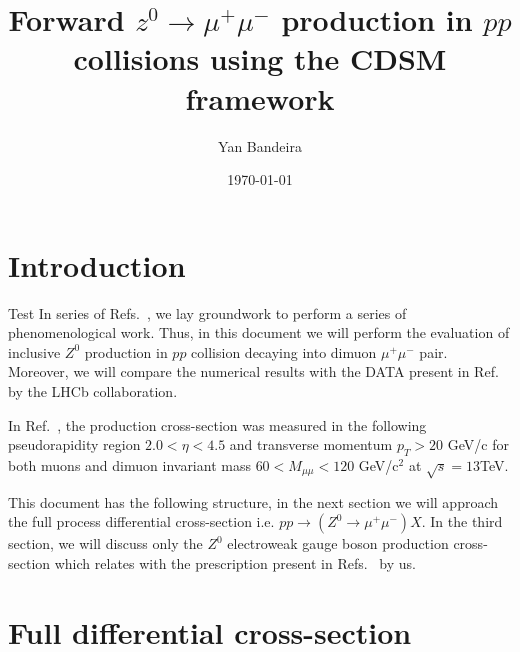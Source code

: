 \documentclass[aps,prd,preprint,superscriptaddress,nofootinbib]{revtex4-2}
\begin{document}
	
	\title{Forward $z^0 \rightarrow \mu^+ \mu^-$ production in $pp$ collisions using the CDSM framework}
	
	\author{Yan Bandeira}
	
	\date{\today}
	
	\maketitle
	
\section{Introduction}
	Test
In series of Refs.~\cite{Bandeira:2024zjl,Bandeira:2024jjl,Bandeira:2025fut}, we lay groundwork to perform a series of phenomenological work. Thus, in this document we will perform the evaluation of inclusive $Z^0$ production in $pp$ collision decaying into dimuon $\mu^+ \mu^-$ pair. Moreover, we will compare the numerical results with the DATA present in Ref.~\cite{LHCb:2021huf} by the LHCb collaboration.
\par 
In Ref.~\cite{LHCb:2021huf}, the production cross-section was measured in the following pseudorapidity region $2.0 < \eta < 4.5$ and transverse momentum $p_T > 20$ GeV/c for both muons and dimuon invariant mass $60 < M_{\mu\mu} < 120$ GeV/c$^2$ at $\sqrt s = 13$TeV.
\par 
This document has the following structure, in the next section we will approach the full process differential cross-section i.e. $pp\rightarrow (Z^0 \rightarrow \mu^+\mu^-)X$. In the third section, we will discuss only the $Z^0$ electroweak gauge boson production cross-section which relates with the prescription present in Refs.~\cite{Bandeira:2024zjl,Bandeira:2024jjl}  by us.
\section{Full differential cross-section}
\end{document}

